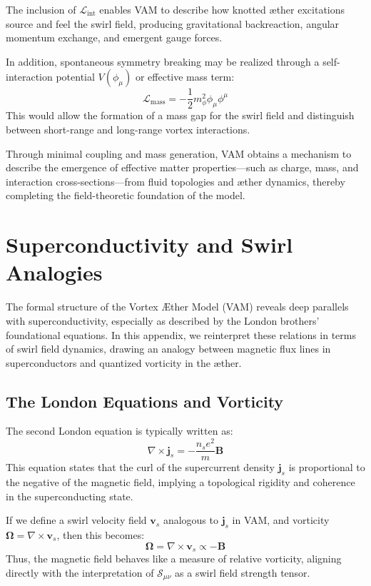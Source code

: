 The inclusion of $\mathcal{L}_{\text{int}}$ enables VAM to describe how knotted æther excitations source and feel the swirl field, producing gravitational backreaction, angular momentum exchange, and emergent gauge forces.

In addition, spontaneous symmetry breaking may be realized through a self-interaction potential $V(\phi_\mu)$ or effective mass term:
\begin{equation}
    \mathcal{L}_{\text{mass}} = -\frac{1}{2} m_\phi^2 \phi_\mu \phi^\mu
\end{equation}
This would allow the formation of a mass gap for the swirl field and distinguish between short-range and long-range vortex interactions.

Through minimal coupling and mass generation, VAM obtains a mechanism to describe the emergence of effective matter properties---such as charge, mass, and interaction cross-sections---from fluid topologies and æther dynamics, thereby completing the field-theoretic foundation of the model.

\section{Superconductivity and Swirl Analogies}
The formal structure of the Vortex \AE{}ther Model (VAM) reveals deep parallels with superconductivity, especially as described by the London brothers' foundational equations. In this appendix, we reinterpret these relations in terms of swirl field dynamics, drawing an analogy between magnetic flux lines in superconductors and quantized vorticity in the æther.

\subsection{The London Equations and Vorticity}
The second London equation is typically written as:
\begin{equation}
    \nabla \times \mathbf{j}_s = -\frac{n_s e^2}{m} \mathbf{B}
\end{equation}
This equation states that the curl of the supercurrent density $\mathbf{j}_s$ is proportional to the negative of the magnetic field, implying a topological rigidity and coherence in the superconducting state.

If we define a swirl velocity field $\mathbf{v}_s$ analogous to $\mathbf{j}_s$ in VAM, and vorticity $\boldsymbol{\Omega} = \nabla \times \mathbf{v}_s$, then this becomes:
\begin{equation}
    \boldsymbol{\Omega} = \nabla \times \mathbf{v}_s \propto -\mathbf{B}
\end{equation}
Thus, the magnetic field behaves like a measure of relative vorticity, aligning directly with the interpretation of $\mathcal{S}_{\mu\nu}$ as a swirl field strength tensor.

